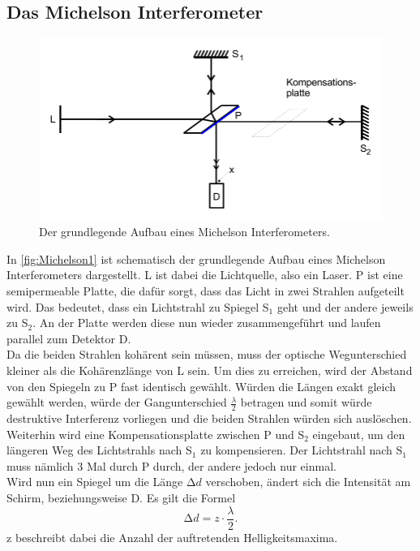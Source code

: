 \subsection{Das Michelson Interferometer}

\begin{figure}
    \centering
    \includegraphics[width=0.8 \linewidth]{pictures/Michelson1.pdf}
    \caption{Der grundlegende Aufbau eines Michelson Interferometers.}
    \label{fig:Michelson1}
\end{figure}

In \autoref{fig:Michelson1} ist schematisch der grundlegende Aufbau eines Michelson Interferometers dargestellt.
L ist dabei die Lichtquelle, also ein Laser. P ist eine semipermeable Platte, die dafür sorgt, dass das Licht
in zwei Strahlen aufgeteilt wird. Das bedeutet, dass ein Lichtstrahl zu Spiegel S$_1$ geht und der andere jeweils zu S$_2$.
An der Platte werden diese nun wieder zusammengeführt und laufen parallel zum Detektor D.\\
Da die beiden Strahlen kohärent sein müssen, muss der optische Wegunterschied kleiner als die Kohärenzlänge von L sein.
Um dies zu erreichen, wird der Abstand von den Spiegeln zu P fast identisch gewählt.
Würden die Längen exakt gleich gewählt werden, würde der Gangunterschied $\frac{\lambda}{2}$ betragen und
somit würde destruktive Interferenz vorliegen und die beiden Strahlen würden sich auslöschen.
Weiterhin wird eine Kompensationsplatte zwischen P und S$_2$ eingebaut, um den längeren Weg des Lichtstrahls nach S$_1$ zu kompensieren.
Der Lichtstrahl nach S$_1$ muss nämlich 3 Mal durch P durch, der andere jedoch nur einmal.\\
Wird nun ein Spiegel um die Länge $\increment d$ verschoben, ändert sich die Intensität am Schirm, beziehungsweise D.
Es gilt die Formel
\begin{equation}
    \increment d = z \cdot \frac{\lambda}{2}.
\end{equation}
z beschreibt dabei die Anzahl der auftretenden Helligkeitsmaxima.

